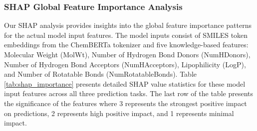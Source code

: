 \documentclass[preprint,12pt]{elsarticle}
\begin{document}
\subsubsection*{SHAP Global Feature Importance Analysis}

Our SHAP analysis provides insights into the global feature importance patterns for the actual model input features. The model inputs consist of SMILES token embeddings from the ChemBERTa tokenizer and five knowledge-based features: Molecular Weight (MolWt), Number of Hydrogen Bond Donors (NumHDonors), Number of Hydrogen Bond Acceptors (NumHAcceptors), Lipophilicity (LogP), and Number of Rotatable Bonds (NumRotatableBonds). Table \ref{tab:shap_importance} presents detailed SHAP value statistics for these model input features across all three prediction tasks. The last row of the table presents the significance of the features where 3 represents the strongest positive impact on predictions, 2 represents high positive impact, and 1 represents minimal impact.


\end{document}

